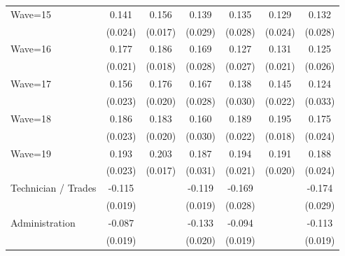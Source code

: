 {\begin{tabular}{l*{6}{c}}
Wave=15             &       0.141\sym{***}&       0.156\sym{***}&       0.139\sym{***}&       0.135\sym{***}&       0.129\sym{***}&       0.132\sym{***}\\
                    &     (0.024)         &     (0.017)         &     (0.029)         &     (0.028)         &     (0.024)         &     (0.028)         \\
Wave=16             &       0.177\sym{***}&       0.186\sym{***}&       0.169\sym{***}&       0.127\sym{***}&       0.131\sym{***}&       0.125\sym{***}\\
                    &     (0.021)         &     (0.018)         &     (0.028)         &     (0.027)         &     (0.021)         &     (0.026)         \\
Wave=17             &       0.156\sym{***}&       0.176\sym{***}&       0.167\sym{***}&       0.138\sym{***}&       0.145\sym{***}&       0.124\sym{***}\\
                    &     (0.023)         &     (0.020)         &     (0.028)         &     (0.030)         &     (0.022)         &     (0.033)         \\
Wave=18             &       0.186\sym{***}&       0.183\sym{***}&       0.160\sym{***}&       0.189\sym{***}&       0.195\sym{***}&       0.175\sym{***}\\
                    &     (0.023)         &     (0.020)         &     (0.030)         &     (0.022)         &     (0.018)         &     (0.024)         \\
Wave=19             &       0.193\sym{***}&       0.203\sym{***}&       0.187\sym{***}&       0.194\sym{***}&       0.191\sym{***}&       0.188\sym{***}\\
                    &     (0.023)         &     (0.017)         &     (0.031)         &     (0.021)         &     (0.020)         &     (0.024)         \\
Technician / Trades &      -0.115\sym{***}&                     &      -0.119\sym{***}&      -0.169\sym{***}&                     &      -0.174\sym{***}\\
                    &     (0.019)         &                     &     (0.019)         &     (0.028)         &                     &     (0.029)         \\
Administration      &      -0.087\sym{***}&                     &      -0.133\sym{***}&      -0.094\sym{***}&                     &      -0.113\sym{***}\\
                    &     (0.019)         &                     &     (0.020)         &     (0.019)         &                     &     (0.019)         \\

\end{tabular}}
